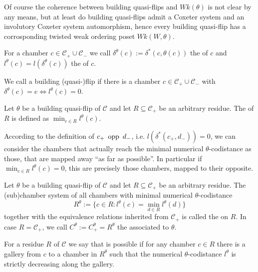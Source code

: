 Of course the coherence between building quasi-flips and $Wk(\theta)$ is not clear by any means, but at least do building quasi-flips admit a Coxeter system and an involutory Coxeter system automorphism, hence every building quasi-flip has a corrosponding twisted weak ordering poset $Wk(W,\theta)$.

\begin{defi}
	For a chamber $c \in \mathcal C_+ \cup \mathcal C_-$ we call $\delta^\theta(c) := \delta^*(c,\theta(c))$ the  of $c$ and $l^\theta(c) = l(\delta^\theta(c))$ the  of $c$.
\end{defi}

\begin{defi}
	We call a building (quasi-)flip  if there is a chamber $c \in \mathcal{C}_+ \cup \mathcal{C}_-$ with $\delta^{\theta}(c) = e \iff l^{\theta}(c) = 0$.
\end{defi}

\begin{defi}
	Let $\theta$ be a building quasi-flip of $\mathcal C$ and let $R \subseteq \mathcal C_+$ be an arbitrary residue. The  of $R$ is defined as $\min_{c \in R} l^{\theta}(c)$.
\end{defi}

According to the definition of $c_+ \opp d_-$, i.e. $l(\delta^*(c_+,d_-)) = 0$, we can consider the chambers that actually reach the minimal numerical $\theta$-codistance as those, that are mapped away ``as far as possible''. In particular if $\min_{c \in R} l^{\theta}(c) = 0$, this are precisely those chambers, mapped to their opposite.

\begin{defi}
	Let $\theta$ be a building quasi-flip of $\mathcal C$ and let $R \subseteq \mathcal C_+$ be an arbitrary residue. The (sub)chamber system of all chambers with minimal numerical $\theta$-codistance
	$$ R^\theta := \{ c \in R : l^\theta(c) = \min_{d \in R} l^\theta(d) \} $$
	together with the equivalence relations inherited from $\mathcal C_+$ is called the  on $R$. In case $R = \mathcal C_+$, we call $C^\theta := C_+^\theta = R^\theta$ the  associated to $\theta$.
\end{defi}

\begin{defi}
	For a residue $R$ of $\mathcal{C}$ we say that  is possible if for any chamber $c \in R$ there is a gallery from $c$ to a chamber in $R^\theta$ such that the numerical $\theta$-codistance $l^\theta$ is strictly decreasing along the gallery.
\end{defi}

